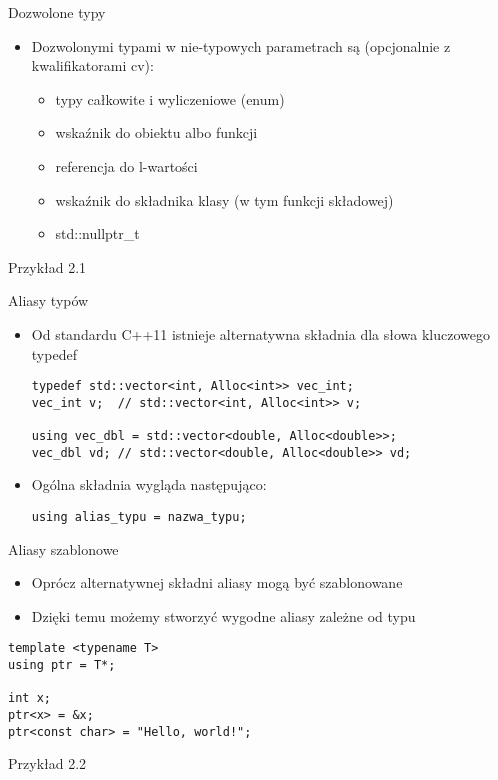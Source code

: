 \documentclass[11pt]{beamer}
\begin{document}
\begin{frame}[fragile]{Dozwolone typy}
    \begin{itemize}
        \item Dozwolonymi typami w nie-typowych parametrach są (opcjonalnie z kwalifikatorami cv):
        \begin{itemize}
            \item typy całkowite i wyliczeniowe (enum)
            \item wskaźnik do obiektu albo funkcji
            \item referencja do l-wartości
            \item wskaźnik do składnika klasy (w tym funkcji składowej)
            \item std::nullptr\_t
        \end{itemize}
    \end{itemize}
    \alert{Przykład 2.1}
\end{frame}

\begin{frame}[fragile]{Aliasy typów}
    \begin{itemize}
        \item Od standardu C++11 istnieje alternatywna składnia dla słowa kluczowego typedef
    \begin{lstlisting}[frame=single]
typedef std::vector<int, Alloc<int>> vec_int;
vec_int v;  // std::vector<int, Alloc<int>> v;

using vec_dbl = std::vector<double, Alloc<double>>;
vec_dbl vd; // std::vector<double, Alloc<double>> vd;
    \end{lstlisting}
        \item Ogólna składnia wygląda następująco:
\begin{lstlisting}[frame=single]
using alias_typu = nazwa_typu;
    \end{lstlisting}
    
    \end{itemize}
\end{frame}

\begin{frame}[fragile]{Aliasy szablonowe}
    \begin{itemize}
        \item Oprócz alternatywnej składni aliasy mogą być szablonowane
        \item Dzięki temu możemy stworzyć wygodne aliasy zależne od typu
    \end{itemize}
    \begin{lstlisting}[frame=single]
template <typename T>
using ptr = T*;

int x;
ptr<x> = &x;
ptr<const char> = "Hello, world!";
    \end{lstlisting}
    \alert{Przykład 2.2}
\end{frame}
\end{document}
